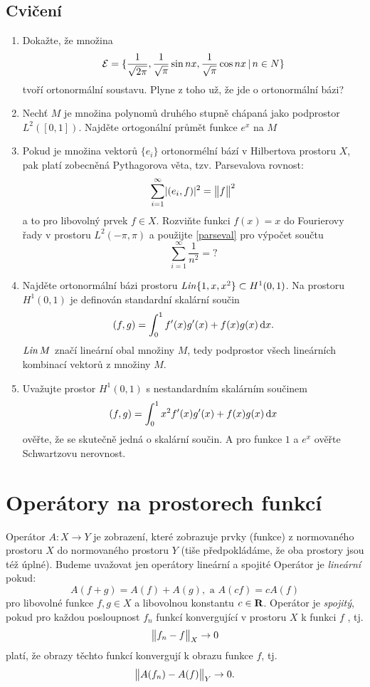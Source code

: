 \subsection{Cvičení}
\begin{enumerate}
 \item Dokažte, že množina
  \[
     \mathcal E =\{\frac{1}{\sqrt{2\pi}}, \frac{1}{\sqrt{\pi}}\sin nx, \frac{1}{\sqrt{\pi}}\cos nx\,|\, n\in N\}
  \]
  tvoří ortonormální soustavu. Plyne z toho už, že jde o ortonormální bázi?

  \item Nechť $M$ je množina polynomů druhého stupně chápaná jako podprostor $L^2([0,1])$. Najděte ortogonální průmět funkce $e^x$ na $M$

   \item Pokud je množina vektorů $\{e_i\}$ ortonormélní bází v Hilbertova prostoru $X$, pak platí zobecněná Pythagorova věta, tzv. Parsevalova rovnost:
  \begin{equation}\label{parseval}
      \sum_{i=1}^\infty \lvert(e_i, f)\rvert^2 = \bigl\Vert f\bigr\Vert^2
  \end{equation}
  a to pro libovolný prvek $f\in X$. Rozviňte funkci $f(x)=x$ do Fourierovy řady v prostoru $L^2(-\pi,\pi)$ a použijte 
  \eqref{parseval} pro výpočet součtu 
  \[
     \sum_{i=1}^\infty \frac{1}{n^2} = ?
  \]

  \item Najděte ortonormální bázi prostoru $\mathit{Lin}\{1,x,x^2\}\subset H^1(0,1)$. Na prostoru $H^1(0,1)$ je definován standardní skalární součin
  \[
     (f,g)= \int_0^1 f'(x)g'(x)+f(x)g(x) \,{\rm d} x. 
  \]
  $\mathit{Lin}\, M$ značí lineární obal množiny $M$, tedy podprostor všech lineárních kombinací vektorů z množiny $M$.

  \item Uvažujte prostor $H^1(0,1)$ s nestandardním skalárním součinem 
  \[
     (f,g)=\int_0^1 x^2 f'(x) g'(x) +f(x) g(x) \,{\rm d} x
  \]
  ověřte, že se skutečně jedná o skalární součin. A pro funkce $1$ a $e^x$ ověřte Schwartzovu nerovnost.


\end{enumerate}

\section{Operátory na prostorech funkcí}
Operátor $A:X \to Y$ je zobrazení, které zobrazuje prvky (funkce) z normovaného prostoru $X$ do normovaného prostoru $Y$
(tiše předpokládáme, že oba prostory jsou též úplné). Budeme uvažovat jen operátory lineární a spojité
Operátor je {\it lineární} pokud:
\[ 
        A(f+g)=A(f)+A(g), \text{ a } A(cf)=cA(f)
\]
pro libovolné funkce $f,g\in X$ a libovolnou konstantu $c\in {\rm\bf R}$. Operátor je {\it spojitý}, pokud
pro každou posloupnost $f_n$ funkcí konvergující v prostoru $X$ k funkci $f$ , tj.
\[ \bigl\Vert f_n - f\bigr\Vert_X \rightarrow 0 \]
platí, že obrazy těchto funkcí konvergují k obrazu funkce $f$, tj.
\[ \bigl\Vert A(f_n) - A(f) \bigr\Vert_Y \rightarrow 0 .\]

